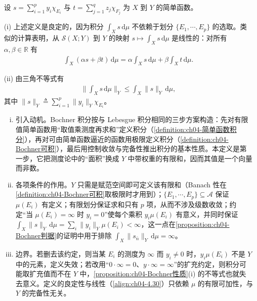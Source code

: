 \documentclass[../../main.tex]{subfiles}%
\begin{document}
\begin{remark}\label{remark:ch04-简单积分性质}
设 $s=\sum_{i=1}^p y_i\chi_{E_i}$ 与 $t=\sum_{j=1}^q z_j\chi_{F_j}$ 为 $X$ 到 $Y$ 的简单函数。

(i) 上述定义是良定的，因为积分 $\int_X s\,\mathrm{d}\mu$ 不依赖于划分 $\{E_1,\cdots ,E_p\}$ 的选取。类似的计算表明，从 $\mathcal{S}(X;Y)$ 到 $Y$ 的映射 $s\mapsto\int_X s\,\mathrm{d}\mu$ 是线性的：对所有 $\alpha,\beta\in\mathbb{R}$ 有
\begin{align}
\int_X(\alpha s+\beta t)\,\mathrm{d}\mu=\alpha\int_X s\,\mathrm{d}\mu+\beta\int_X t\,\mathrm{d}\mu. \label{align:ch04-4.30}
\end{align}

(ii) 由三角不等式有
\begin{align}
\Big\|\int_X s\,\mathrm{d}\mu\Big\|_Y\leqslant\int_X\|s\|_Y\,\mathrm{d}\mu, \label{align:ch04-4.31}
\end{align}
其中 $\|s\|_Y\triangleq \sum_{i=1}^p\|y_i\|_Y\chi_{E_i}$。
\end{remark}

\begin{remark}\label{remark:ch04-简单积分动机}
\begin{enumerate}[(i)]
\item 引入动机。Bochner 积分按与 Lebesgue 积分相同的三步方案构造：先对有限值简单函数用“取值乘测度再求和”定义积分（\cref{definition:ch04-简单函数积分}），再对可由简单函数逼近的函数用极限定义积分（\cref{definition:ch04-Bochner可积}），最后用控制收敛与完备性推出积分的基本性质。本定义是第一步，它把测度论中的“面积”换成 $Y$ 中带权重的有限和，因而其值是一个向量而非数。

\item 各项条件的作用。$Y$ 只需是赋范空间即可定义该有限和（Banach 性在\cref{definition:ch04-Bochner可积}取极限时才用到）；$\{E_1,\cdots ,E_p\}\subseteq\mathcal{A}$ 保证 $\mu(E_i)$ 有定义；有限划分保证求和只有 $p$ 项，从而不涉及级数收敛；约定“当 $\mu(E_i)=\infty$ 时 $y_i=0$”使每个乘积 $y_i\mu(E_i)$ 有意义，并同时保证 $\int_X\|s\|_Y\,\mathrm{d}\mu=\sum_i\|y_i\|_Y\mu(E_i)<\infty$，这一点在\cref{proposition:ch04-Bochner判据}的证明中用于排除 $\int_X\|s_{\bar n}\|_Y\,\mathrm{d}\mu=\infty$。

\item 边界。若删去该约定，则当某 $E_i$ 的测度为 $\infty$ 而 $y_i\neq0$ 时，$y_i\mu(E_i)$ 不是 $Y$ 中的元素，定义失效；若改用“$0\cdot\infty=0$、$y\cdot\infty=\infty$”的扩充约定，则积分可能取扩充值而不在 $Y$ 中，\cref{proposition:ch04-Bochner性质}(i) 的不等式也就失去意义。定义的良定性与线性（\eqref{align:ch04-4.30}）只依赖 $\mu$ 的有限可加性，与 $Y$ 的完备性无关。
\end{enumerate}
\end{remark}
\end{document}
